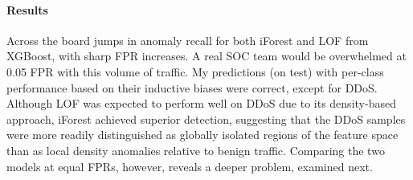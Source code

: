 \documentclass{article}
\begin{document}
\begin{table}[H]
\centering
{}
\caption{Per-class recall; iForest vs. LOF; XGBoost values copied from table 5}
\end{table}
\paragraph{Results} Across the board jumps in anomaly recall for both iForest and LOF from XGBoost, with sharp FPR increases. A real SOC team would be overwhelmed at 0.05 FPR with this volume of traffic. My predictions (on test) with per-class performance based on their inductive biases were correct, except for DDoS. Although LOF was expected to perform well on DDoS due to its density-based approach, iForest achieved superior detection, suggesting that the DDoS samples were more readily distinguished as globally isolated regions of the feature space than as local density anomalies relative to benign traffic. Comparing the two models at equal FPRs, however, reveals a deeper problem, examined next.
\end{document}
